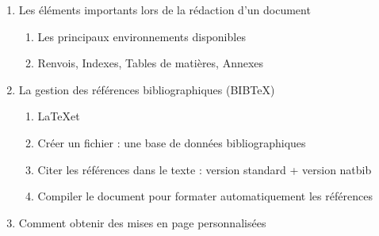 \begin{enumerate}
\item Les éléments importants lors de la rédaction d'un document

  \begin{enumerate}

  \item Les principaux environnements disponibles
    
  \item Renvois, Indexes, Tables de matières, Annexes
    
  \end{enumerate}

\item La gestion des références bibliographiques (\textsc{BIB}\TeX)
    
  \begin{enumerate}
  \item \LaTeX et \BiBTeX
  \item Créer un fichier \BiBTeX : une base de données bibliographiques
  \item Citer les références dans le texte : version standard + version natbib
  \item Compiler le document pour formater automatiquement les références
  \end{enumerate}




\item Comment obtenir des mises en page personnalisées
    

\end{enumerate}
